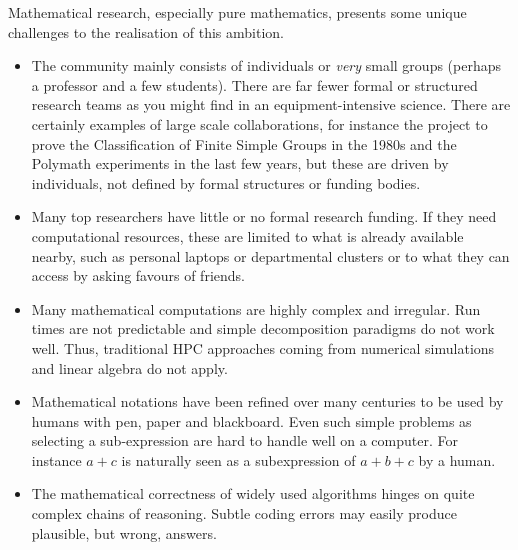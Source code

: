 Mathematical research, especially pure mathematics, presents some
unique challenges to the realisation of this ambition.


\begin{itemize}
\item The community mainly consists of individuals or \textit{very} small
  groups (perhaps a professor and a few students). There are far fewer formal or structured research
  teams as you might find in an equipment-intensive science. There are
  certainly examples of large scale collaborations, for instance the
  project to prove the Classification of Finite Simple Groups in the
  1980s and the Polymath experiments in the last few years,
  but these are driven by individuals, not defined by formal
  structures or funding bodies.
\item Many top researchers have little or no formal research
  funding. If they need computational resources, these are limited to what 
  is already available nearby, such as personal laptops or
  departmental clusters or to what they can access by asking favours
  of friends.
\item Many mathematical computations are highly complex and irregular.
  Run times are not predictable and simple decomposition paradigms do
  not work well. Thus,
  traditional HPC approaches coming from numerical simulations and linear algebra do not apply.
\item Mathematical notations have been refined over many centuries to be
  used by humans with pen, paper and blackboard. Even such simple
  problems as selecting a sub-expression are hard to handle well on a
  computer. For instance $a+c$ is naturally seen as a subexpression of
  $a+b+c$ by a human.
\item The mathematical correctness of widely used algorithms hinges on
  quite complex chains of reasoning. Subtle coding errors may easily
  produce plausible, but wrong, answers.


\end{itemize}
